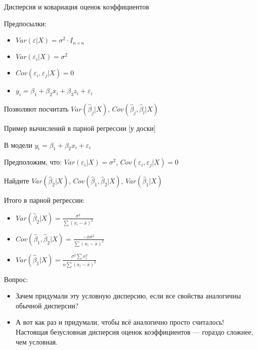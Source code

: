 \documentclass[russian,ignorenonframetext,]{beamer}
\providecommand{\tightlist}{%
  \setlength{\itemsep}{0pt}\setlength{\parskip}{0pt}}
\newcommand{\e}{\varepsilon}
\begin{document}
\begin{frame}{Дисперсия и ковариация оценок коэффициентов}

Предпосылки:

\begin{itemize}
\tightlist
\item
  \(Var(\varepsilon|X)=\sigma^2 \cdot I_{n\times n}\)
\item
  \(Var(\varepsilon_i|X)=\sigma^2\)
\item
  \(Cov(\varepsilon_i,\varepsilon_j|X)=0\)
\item
  \(y_i=\beta_1 + \beta_2 x_i + \beta_3 z_i +\varepsilon_i\)
\end{itemize}

Позволяют посчитать \(Var(\hat{\beta}_j|X)\),
\(Cov(\hat{\beta}_j,\hat{\beta}_l|X)\)

\end{frame}

\begin{frame}{Пример вычислений в парной регрессии {[}у доски{]}}

В модели \(y_i=\beta_1 + \beta_2 x_i + \varepsilon_i\)

Предположим, что: \(Var(\varepsilon_i|X)=\sigma^2\),
\(Cov(\varepsilon_i, \e_j|X)=0\)

Найдите \(Var(\hat{\beta}_2|X)\),
\(Cov(\hat{\beta}_1,\hat{\beta}_2 |X)\), \(Var(\hat{\beta}_1|X)\)

\end{frame}

\begin{frame}{Итого в парной регрессии:}

\begin{itemize}
\item
  \(Var(\hat{\beta}_2|X)=\frac{\sigma^2}{\sum (x_i-\bar{x})^2}\)
\item
  \(Cov(\hat{\beta}_1,\hat{\beta}_2 |X)=\frac{-\bar{x}\sigma^2}{\sum (x_i-\bar{x})^2}\)
\item
  \(Var(\hat{\beta}_1|X)=\frac{\sigma^2 \sum x_i^2}{n\sum (x_i-\bar{x})^2}\)
\end{itemize}

\end{frame}

\begin{frame}{Вопрос:}

\begin{itemize}
\item
  Зачем придумали эту условную дисперсию, если все свойства аналогичны
  обычной дисперсии?
\item
  А вот как раз и придумали, чтобы всё аналогично просто считалось!
  Настоящая безусловная дисперсия оценок коэффициентов --- гораздо
  сложнее, чем условная.
\end{itemize}

\end{frame}
\end{document}
